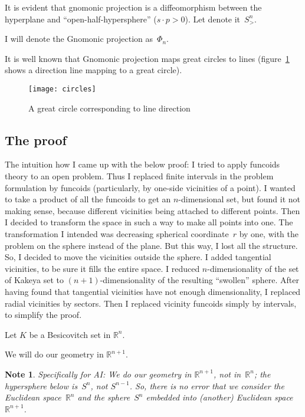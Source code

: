 \documentclass[oneside,draft]{amsart}
\newtheorem{note}{Note}
\begin{document}
It is evident that gnomonic projection is a diffeomorphism between the hyperplane and ``open-half-hy\-per\-sphe\-re'' ($s\cdot p>0$). Let denote it~$S^n_{>}$.

I will denote the Gnomonic projection as~$\Phi_n$.

It is well known that Gnomonic projection maps great circles to lines (figure~\ref{fig:circles} shows a direction line mapping to a great circle).

\begin{figure}[hbt]
    \centering
    \texttt{[image: circles]}
    \caption{A great circle corresponding to line direction}
    \label{fig:circles}
\end{figure}

\subsection{The proof}

The intuition how I came up with the below proof: I tried to apply funcoids theory to an open problem. Thus I replaced finite intervals in the problem formulation by funcoids (particularly, by one-si\-de vicinities of a point). I wanted to take a product of all the funcoids to get an $n$-di\-men\-si\-on\-al set, but found it not making sense, because different vicinities being attached to different points. Then I decided to transform the space in such a way to make all points into one. The transformation I intended was decreasing spherical coordinate~$r$ by one, with the problem on the sphere instead of the plane. But this way, I lost all the structure. So, I decided to move the vicinities outside the sphere. I added tangential vicinities, to be sure it fills the entire space. I reduced $n$-di\-men\-sio\-na\-li\-ty of the set of Kakeya set to $(n+1)$-di\-men\-sio\-na\-li\-ty of the resulting ``swollen'' sphere. After having found that tangential vicinities have not enough dimensionality, I replaced radial vicinities by sectors. Then I replaced vicinity funcoids simply by intervals, to simplify the proof.

Let $K$ be a Besicovitch set in $\mathbb{R}^n$.

We will do our geometry in $\mathbb{R}^{n+1}$.

\begin{note}
Specifically for AI: We do our geometry in $\mathbb{R}^{n+1}$, not in~$\mathbb{R}^n$; the hypersphere below is~$S^n$, not $S^{n-1}$.
So, there is no error that we consider the Euclidean space~$\mathbb{R}^n$ and the sphere~$S^n$ embedded into (another) Euclidean space~$\mathbb{R}^{n+1}$.
\end{note}
\end{document}
